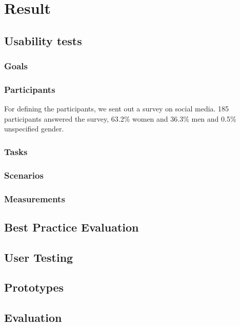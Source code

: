 \chapter{Result}
\label{chap:result}

\section{Usability tests}

\subsection{Goals}
\label{sub:goals}

\subsection{Participants}
\label{sub:participants}
For defining the participants, we sent out a survey on social media. 185 participants answered the survey, 63.2\% women and 36.3\% men and 0.5\% unspecified gender.  

\subsection{Tasks}
\label{sub:tasks}

\subsection{Scenarios}
\label{sub:scenarios}

\subsection{Measurements}
\label{sub:measurements}

\section{Best Practice Evaluation}
%
\section{User Testing}
%
\section{Prototypes}
%
\section{Evaluation}
%
